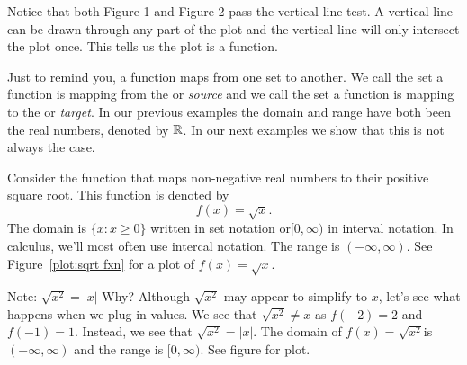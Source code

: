 \documentclass{ximera}
\begin{document}
Notice that both Figure 1 and Figure 2 pass the vertical line test.  A vertical line can be drawn through any part of the plot and the vertical line will only intersect the plot once.  This tells us the plot is a function.

Just to remind you, a function maps from one set to another. We call
the set a function is mapping from the 
or \textit{source} and we call the set a function is mapping to the
 or \textit{target}.  In our previous
examples the domain and range have both been the real numbers, denoted
by $\mathbb R$. In our next examples we show that this is not always the
case.


\begin{example}
Consider the function that maps non-negative real numbers to their positive square root. This function is denoted by 
\[
f(x) = \sqrt{x}.
\]
The domain is $\{x: x\ge 0\}$ written in set notation or$[0,\infty )$ in interval notation.  In calculus, we'll most often use intercal notation.  The range is $(-\infty,\infty)$.
See Figure~\ref{plot:sqrt fxn} for a plot of $f(x) = \sqrt{x}$.
\end{example}

\begin{image}
\end{image}


Note: $\sqrt{x^2} = |x|$  Why?  Although $\sqrt{x^2}$ may appear to simplify to $x$, let's see what happens when we plug in values.
We see that $\sqrt{x^2}\ne x$ as $f(-2)=2$ and $f(-1)=1$.  Instead, we see that $\sqrt{x^2} = |x|$.  The domain of $f(x)=\sqrt{x^2}$is $(-\infty,\infty)$ and the range is $[0,\infty)$.  See figure for plot.
\end{document}
